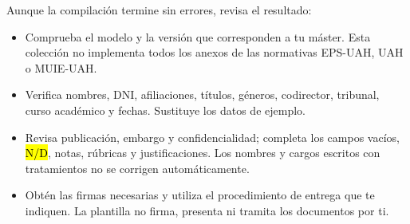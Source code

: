 \documentclass[10pt,a4paper]{article}
\begin{document}
\begin{minipage}{\linewidth}
Aunque la compilación termine sin errores, revisa el resultado:
\begin{itemize}
  \item Comprueba el modelo y la versión que corresponden a tu máster. Esta colección no implementa todos los anexos de las normativas EPS-UAH, UAH o MUIE-UAH.
  \item Verifica nombres, DNI, afiliaciones, títulos, géneros, codirector, tribunal, curso académico y fechas. Sustituye los datos de ejemplo.
  \item Revisa publicación, embargo y confidencialidad; completa los campos vacíos, \hl{N/D}, notas, rúbricas y justificaciones. Los nombres y cargos escritos con tratamientos no se corrigen automáticamente.
  \item Obtén las firmas necesarias y utiliza el procedimiento de entrega que te indiquen. La plantilla no firma, presenta ni tramita los documentos por ti.
\end{itemize}
\end{minipage}
\end{document}
